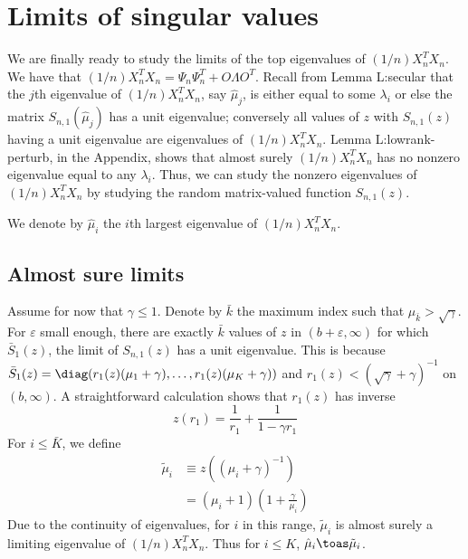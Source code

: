 \clearpage


\section{Limits of singular values}

We are finally ready to study the limits of the top eigenvalues of
$(1/n) X_n^T X_n$.  We have that
$(1/n) X_n^T X_n = \Psi_n \Psi_n^T + O \Lambda O^T$. Recall from
Lemma {L:secular} that the $j$th eigenvalue of $(1/n) X_n^T X_n$, say 
$\hat \mu_j$, is either equal to some $\lambda_i$ or else the matrix
$S_{n,1}(\hat \mu_j)$ has a unit eigenvalue; conversely all values of $z$ with
$S_{n,1}(z)$ having a unit eigenvalue are eigenvalues of $(1/n) X_n^T X_n$.
Lemma {L:lowrank-perturb}, in the Appendix, shows that  almost surely
$(1/n) X_n^T X_n$ has no nonzero eigenvalue equal to any $\lambda_i$.  Thus,
we can study the nonzero eigenvalues of $(1/n) X_n^T X_n$ by studying the
random matrix-valued function $S_{n,1}(z)$.

We denote by $\hat \mu_i$ the $i$th largest eigenvalue of $(1/n) X_n^T X_n$.

\subsection{Almost sure limits}\label{SS:value-limit}

Assume for now that $\gamma \leq 1$.  Denote by $\bar k$ the maximum index such that $\mu_{\bar k} > \sqrt{\gamma}$.  For $\varepsilon$ small enough, there are exactly $\bar k$ values of $z$ in  $(b + \varepsilon, \infty)$ for which $\bar S_1(z)$, the limit of $S_{n,1}(z)$ has a unit eigenvalue.  This is because 
\(
    \bar S_1(z) 
    = 
    \diag( r_1(z) (\mu_1 + \gamma), \ldots, r_1(z) (\mu_K + \gamma))
\)
and $r_1(z) < (\sqrt{\gamma} + \gamma)^{-1}$ on $(b, \infty)$.  A straightforward calculation shows that $r_1(z)$ has inverse
\[
    z(r_1)
    =
    \frac{1}{r_1}
    + 
    \frac{1}{1 - \gamma r_1}
\]
For $i \leq \bar K$, we define
\begin{align*}
    \tilde \mu_i
    &\equiv z\left( (\mu_i + \gamma)^{-1} \right) \\
    &= \left( \mu_i + 1 \right) 
       \left( 1 + \frac{\gamma}{\mu_i} \right)
\end{align*}
Due to the continuity of eigenvalues, for $i$ in this range, $\tilde \mu_i$ is
almost surely a limiting eigenvalue of $(1/n) X_n^T X_n$.  Thus for $i \leq K$,
$\hat \mu_i \toas \tilde \mu_i$.

